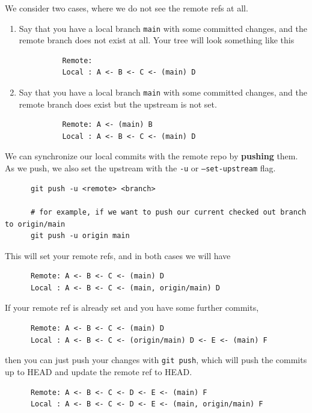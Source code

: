   \begin{definition} 
    We consider two cases, where we do not see the remote refs at all. 
    \begin{enumerate}
      \item Say that you have a local branch \texttt{main} with some committed changes, and the remote branch does not exist at all. Your tree will look something like this 
        \begin{lstlisting}
          Remote: 
          Local : A <- B <- C <- (main) D
        \end{lstlisting}
      \item Say that you have a local branch \texttt{main} with some committed changes, and the remote branch does exist but the upstream is not set. 
        \begin{lstlisting}
          Remote: A <- (main) B
          Local : A <- B <- C <- (main) D
        \end{lstlisting}
    \end{enumerate}
    We can synchronize our local commits with the remote repo by \textbf{pushing} them. As we push, we also set the upstream with the \texttt{-u} or \texttt{--set-upstream} flag. 
    \begin{lstlisting}
      git push -u <remote> <branch> 
      
      # for example, if we want to push our current checked out branch to origin/main
      git push -u origin main
    \end{lstlisting}
    This will set your remote refs, and in both cases we will have 
    \begin{lstlisting}
      Remote: A <- B <- C <- (main) D
      Local : A <- B <- C <- (main, origin/main) D
    \end{lstlisting}
  \end{definition}

  \begin{definition}[Push] 
    If your remote ref is already set and you have some further commits, 
    \begin{lstlisting}
      Remote: A <- B <- C <- (main) D
      Local : A <- B <- C <- (origin/main) D <- E <- (main) F
    \end{lstlisting}
    then you can just push your changes with \texttt{git push}, which will push the commits up to HEAD and update the remote ref to HEAD. 
    \begin{lstlisting}
      Remote: A <- B <- C <- D <- E <- (main) F
      Local : A <- B <- C <- D <- E <- (main, origin/main) F
    \end{lstlisting}
  \end{definition} 

